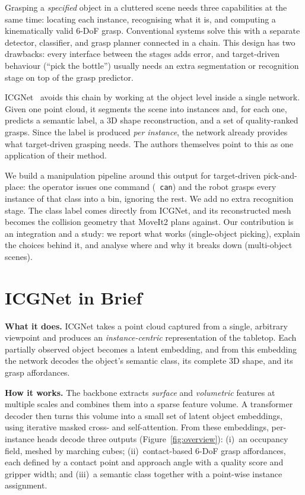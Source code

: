 \documentclass[10pt,twocolumn,letterpaper]{article}
\begin{document}
Grasping a \emph{specified} object in a cluttered scene needs three capabilities at the same time:
locating each instance, recognising what it is, and computing a kinematically valid 6-DoF grasp.
Conventional systems solve this with a separate detector, classifier, and grasp planner connected in
a chain. This design has two drawbacks: every interface between the stages adds error, and
target-driven behaviour (``pick the bottle'') usually needs an extra segmentation or recognition
stage on top of the grasp predictor.

ICGNet~\cite{zurbrugger2024icgnet} avoids this chain by working at the object level inside a single
network. Given one point cloud, it segments the scene into instances and, for each one, predicts a
semantic label, a 3D shape reconstruction, and a set of quality-ranked grasps. Since the label is
produced \emph{per instance}, the network already provides what target-driven grasping needs. The
authors themselves point to this as one application of their method.

We build a manipulation pipeline around this output for target-driven pick-and-place: the operator
issues one command (\eg\ \texttt{can}) and the robot grasps every instance of that class into a bin,
ignoring the rest. We add no extra recognition stage. The class label comes directly from ICGNet, and
its reconstructed mesh becomes the collision geometry that MoveIt2 plans against. Our contribution is
an integration and a study: we report what works (single-object picking), explain the choices behind
it, and analyse where and why it breaks down (multi-object scenes).

\section{ICGNet in Brief}
\label{sec:icgnet}

\noindent\textbf{What it does.}
ICGNet takes a point cloud captured from a single, arbitrary viewpoint and produces an
\emph{instance-centric} representation of the tabletop. Each partially observed object becomes a
latent embedding, and from this embedding the network decodes the object's semantic class, its
complete 3D shape, and its grasp affordances.

\noindent\textbf{How it works.}
The backbone extracts \emph{surface} and \emph{volumetric} features at multiple scales and combines
them into a sparse feature volume. A transformer decoder then turns this volume into a small set of
latent object embeddings, using iterative masked cross- and self-attention. From these embeddings,
per-instance heads decode three outputs (Figure~\ref{fig:overview}): (i)~an occupancy field, meshed by
marching cubes; (ii)~contact-based 6-DoF grasp affordances, each defined by a contact point and
approach angle with a quality score and gripper width; and (iii)~a semantic class together with a
point-wise instance assignment.
\end{document}
